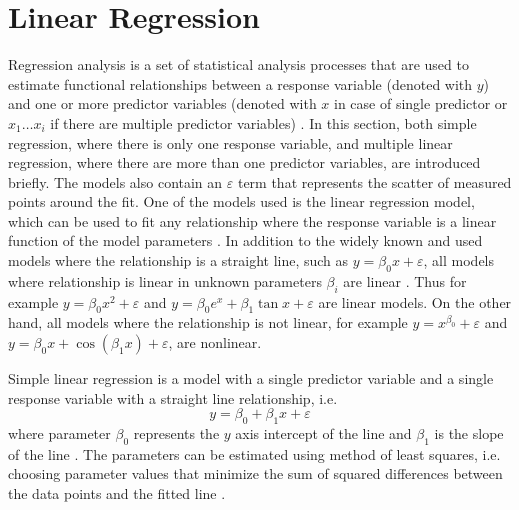 \documentclass[english, oneside]{HYgradu}
\begin{document}
\section{Linear Regression} \label{sect:regression}
Regression analysis is a set of statistical analysis processes that are used to estimate functional relationships between a response variable (denoted with $y$) and one or more predictor variables (denoted with $x$ in case of single predictor or $x_1 \dots x_i$ if there are multiple predictor variables) \citep{feigelson2012modern}. In this section, both simple regression, where there is only one response variable, and multiple linear regression, where there are more than one predictor variables, are introduced briefly. The models also contain an $\varepsilon$ term that represents the scatter of measured points around the fit. One of the models used is the linear regression model, which can be used to fit any relationship where the response variable is a linear function of the model parameters \citep{montgomery2012introduction}. In addition to the widely known and used models where the relationship is a straight line, such as $y = \beta_0 x + \varepsilon$, 
all models where relationship is linear in unknown parameters $\beta_i$ are linear \citep{montgomery2012introduction}. Thus for example $y = \beta_0 x^2 + \varepsilon$ and $y = \beta_0 e^x + \beta_1 \tan{x} + \varepsilon$ are linear models.
On the other hand, all models where the relationship is not linear, for example $y = x^{\beta_0} + \varepsilon$ and $y = \beta_0 x + \cos{(\beta_1 x)} + \varepsilon$,
are nonlinear.

Simple linear regression is a model with a single predictor variable and a single response variable with a straight line relationship, i.e.
\begin{equation}
	y = \beta_0 + \beta_1 x + \varepsilon
\end{equation}
where parameter $\beta_0$ represents the $y$ axis intercept of the line and $\beta_1$ is the slope of the line \citep{montgomery2012introduction}. The parameters can be estimated using method of least squares, i.e. choosing parameter values that minimize the sum of squared differences between the data points and the fitted line \citep{montgomery2012introduction}. 
\end{document}

